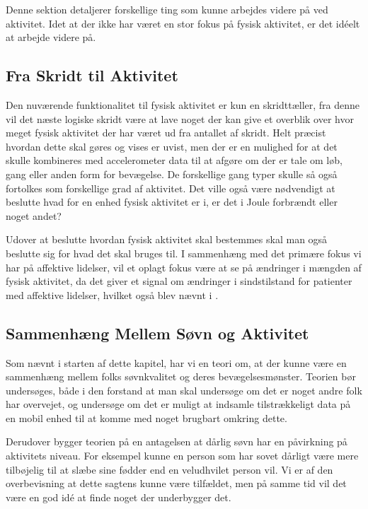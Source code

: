 Denne sektion detaljerer forskellige ting som kunne arbejdes videre på ved aktivitet.
Idet at der ikke har været en stor fokus på fysisk aktivitet, er det idéelt at arbejde videre på.

\subsection{Fra Skridt til Aktivitet}
Den nuværende funktionalitet til fysisk aktivitet er kun en skridttæller, fra denne vil det næste logiske skridt være at lave noget der kan give et overblik over hvor meget fysisk aktivitet der har været ud fra antallet af skridt.
Helt præcist hvordan dette skal gøres og vises er uvist, men der er en mulighed for at det skulle kombineres med accelerometer data til at afgøre om der er tale om løb, gang eller anden form for bevægelse.
De forskellige gang typer skulle så også fortolkes som forskellige grad af aktivitet. 
Det ville også være nødvendigt at beslutte hvad for en enhed fysisk aktivitet er i, er det i Joule forbrændt eller noget andet?

Udover at beslutte hvordan fysisk aktivitet skal bestemmes skal man også beslutte sig for hvad det skal bruges til.
I sammenhæng med det primære fokus vi har på affektive lidelser, vil et oplagt fokus være at se på ændringer i mængden af fysisk aktivitet, da det giver et signal om ændringer i sindstilstand for patienter med affektive lidelser, hvilket også blev nævnt i \citet[Kapitel 1, Sektion 4]{misc:faellesrapp}.

\subsection{Sammenhæng Mellem Søvn og Aktivitet}
Som nævnt i starten af dette kapitel, har vi en teori om, at der kunne være en sammenhæng mellem folks søvnkvalitet og deres bevægelsesmønster.
Teorien bør undersøges, både i den forstand at man skal undersøge om det er noget andre folk har overvejet, og undersøge om det er muligt at indsamle tilstrækkeligt data på en mobil enhed til at komme med noget brugbart omkring dette.

Derudover bygger teorien på en antagelsen at dårlig søvn har en påvirkning på aktivitets niveau.
For eksempel kunne en person som har sovet dårligt være mere tilbøjelig til at slæbe sine fødder end en veludhvilet person vil.
Vi er af den overbevisning at dette sagtens kunne være tilfældet, men på samme tid vil det være en god idé at finde noget der underbygger det.

